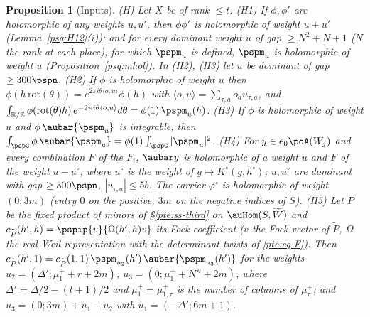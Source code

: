 \documentclass[10pt]{amsart}
\newtheorem{proposition}[theorem]{Proposition}
\theoremstyle{definition}
\theoremstyle{remark}
\newcommand{\R}{\mathbb R}
\newcommand{\Z}{\mathbb Z}
\begin{document}
\begin{proposition}[Inputs]\label{psp:inputs}
\textup{(H)} Let $X$ be of rank $\le t$.
\textup{(H1)} If $\phi,\phi'$ are holomorphic of any weights $u,u'$, then $\phi\phi'$ is holomorphic of
weight $u+u'$ \textup{(}Lemma~\ref{psq:H12}\textup{(i))}; and for every dominant weight $u$ of gap $\ge N^2+N+1$
\textup{(}$N$ the rank at each place\textup{)}, for which $\pspm_u$ is defined,
$\pspm_u$ is holomorphic of weight $u$ \textup{(}Proposition~\ref{psq:mhol}\textup{)}. In \textup{(H2)}, \textup{(H3)} let $u$ be dominant of gap $\ge300\pspn$. \textup{(H2)} If $\phi$ is holomorphic of
weight $u$ then $\phi(h\,\mathrm{rot}(\theta))=e^{2\pi i\theta\langle o,u\rangle}\phi(h)$ with
$\langle o,u\rangle=\sum_{\tau,a}o_au_{\tau,a}$, and
$\int_{\R/\Z}\phi(\mathrm{rot}(\theta)h)\,e^{-2\pi i\theta\langle o,u\rangle}d\theta=\phi(1)\,\pspm_u(h)$.
\textup{(H3)} If $\phi$ is holomorphic of weight $u$ and $\phi\,\aubar{\pspm_u}$ is integrable, then
$\int_{\pspG}\phi\,\aubar{\pspm_u}=\phi(1)\int_{\pspG}|\pspm_u|^2$.
\textup{(H4)} For $y\in e_0\poA(W_j)$ and every combination $F$ of the $F_i$, $\aubar y$ is
holomorphic of a weight $u$ and $F$ of the weight $u-u^\circ$, where $u^\circ$ is the weight of
$g\mapsto K^\circ(g,h^\circ)$; $u,u^\circ$ are dominant with gap $\ge300\pspn$, $|u_{\tau,a}|\le5b$.
The carrier $\varphi^\circ$ is holomorphic of weight $(0;3m)$ (entry $0$ on the positive, $3m$ on
the negative indices of $S$). \textup{(H5)} Let $\widetilde P$ be the fixed product of minors of
\S\ref{pte:ss-third} on $\auHom(S,\widetilde W)$ and $c_{\widetilde P}(h',h)=\pspip{v}{\Omega(h',h)v}$
its Fock coefficient \textup{(}$v$ the Fock vector of $\widetilde P$, $\Omega$ the real Weil
representation with the determinant twists of \eqref{pte:eq-F}\textup{)}. Then
$c_{\widetilde P}(h',1)=c_{\widetilde P}(1,1)\,\pspm_{u_2}(h')\,\aubar{\pspm_{u_3}(h')}$ for the
weights $u_2=(\Delta';\mu^+_{1}+r+2m)$, $u_3=(0;\mu^+_1+N''+2m)$, where $\Delta'=\Delta/2-(t+1)/2$ and
$\mu^+_1=\mu^+_{1,\tau}$ is the number of columns of $\mu^+_\tau$; and $u_3=(0;3m)+u_1+u_2$ with
$u_1=(-\Delta';6m+1)$.


\end{proposition}
\end{document}
